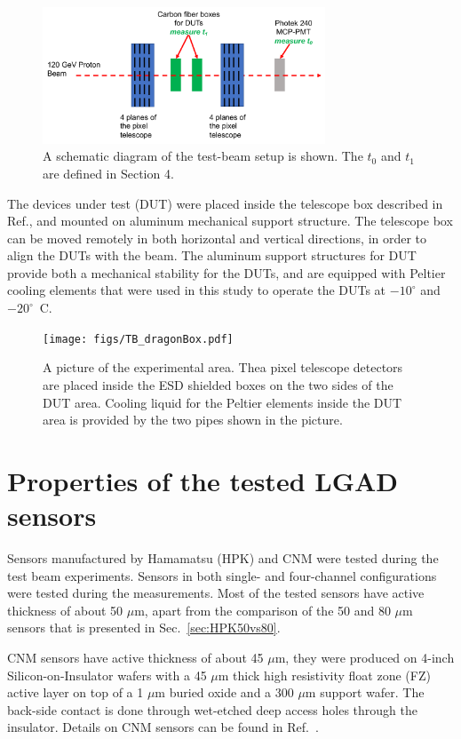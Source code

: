 \documentclass[preprint,1p]{elsarticle}
\begin{document}
\begin{figure}[htbp] 
\centering
\includegraphics[width=0.75\textwidth]{figs/BeamSetup.pdf} 
\caption{A schematic diagram of the test-beam setup is shown. The $t_0$ and $t_1$ are defined in Section 4.} 
\label{fig:DragonBoxDiagram} 
\end{figure} 

The devices under test (DUT) were placed inside the telescope box described in
Ref.\cite{KWAN2016162}, and mounted on aluminum mechanical support structure.
The telescope box can be moved remotely in both horizontal and vertical
directions, in order to align the DUTs with the beam. The aluminum support
structures for DUT provide both a mechanical stability for the DUTs, and are
equipped with Peltier cooling elements that were used in this study to operate
the DUTs at $-10^{\circ}$ and $-20^{\circ}$~C.

\begin{figure}[htbp] 
\centering
\texttt{[image: figs/TB\_dragonBox.pdf]} 
\caption{A picture of the experimental area. Thea pixel telescope detectors are placed inside the ESD shielded boxes on the two sides of the DUT area. Cooling liquid for the Peltier elements inside the DUT area is provided by the two pipes shown in the picture.} 
\label{fig:DragonBox} 
\end{figure} 


\section{Properties of the tested LGAD sensors}


Sensors manufactured by Hamamatsu (HPK) and CNM were tested during the test beam
experiments. Sensors in both single- and four-channel configurations were tested
during the measurements. Most of the tested sensors have active thickness of
about 50 $\mu$m, apart from the comparison of the 50 and 80 $\mu$m sensors that
is presented in Sec.~\ref{sec:HPK50vs80}.

CNM sensors have active thickness of about 45 $\mu$m, they were
produced on 4-inch Silicon-on-Insulator wafers with a 45 $\mu$m thick high
resistivity float zone (FZ) active layer on top of a 1 $\mu$m buried oxide and a
300 $\mu$m support wafer. The back-side contact is done through wet-etched deep
access holes through the insulator. Details on CNM sensors can be found in
Ref.~\cite{CNMSensors, Cartiglia201783}. 
\end{document}
